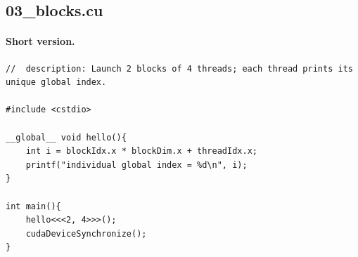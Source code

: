 \documentclass[main.tex]{subfiles}
\begin{document}
\subsection{03\_blocks.cu}
\paragraph{Short version.}
\begin{lstlisting}[language=CUDA]
//  description: Launch 2 blocks of 4 threads; each thread prints its unique global index.

#include <cstdio>

__global__ void hello(){
    int i = blockIdx.x * blockDim.x + threadIdx.x;
    printf("individual global index = %d\n", i);
}

int main(){
    hello<<<2, 4>>>();
    cudaDeviceSynchronize();
}
\end{lstlisting}
\end{document}
